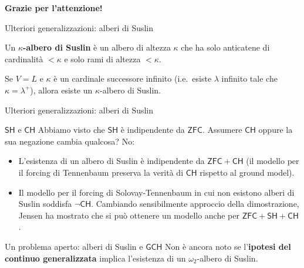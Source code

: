 \documentclass{beamer}
\theoremstyle{num.custom-title}
\theoremstyle{custom-title}
\newcommand{\ZFC}{\ensuremath{\mathsf{ZFC}}\xspace}
\newcommand{\GCH}{\ensuremath{\mathsf{GCH}}\xspace}
\newcommand{\CH}{\ensuremath{\mathsf{CH}}\xspace}
\newcommand{\SH}{\ensuremath{\mathsf{SH}}\xspace}
\renewcommand{\emph}[1]{\textbf{#1}}
\begin{document}
\begin{frame}[plain]
\begin{center}
\Large \textbf{Grazie per l'attenzione!}
\end{center}
\end{frame}


\begin{frame}{Ulteriori generalizzazioni: alberi di Suslin}

\begin{definition}
Un $\kappa$\emph{-albero di Suslin} è un albero di altezza $\kappa$ che ha solo anticatene di cardinalità $<\kappa$ e solo rami di altezza $<\kappa$.
\end{definition}

\begin{theorem}[Jensen, 1972]
Se $V=L$ e $\kappa$ è un cardinale successore infinito (i.e.\ esiste $\lambda$ infinito tale che $\kappa = \lambda^+$), allora esiste un $\kappa$-albero di Suslin.
\end{theorem}

\end{frame}


\begin{frame}{Ulteriori generalizzazioni: alberi di Suslin}

\begin{alertblock}{\SH e \CH}
Abbiamo visto che \SH è indipendente da \ZFC. Assumere \CH oppure la sua negazione cambia qualcosa? No:
\vspace{-5pt}
\begin{itemize}
\item L'esistenza di un albero di Suslin è indipendente da $\ZFC + \CH$ (il modello per il forcing di Tennenbaum preserva la verità di \CH rispetto al ground model).
\item Il modello per il forcing di Solovay-Tennenbaum in cui non esistono alberi di Suslin soddisfa $\neg \CH$. Cambiando sensibilmente approccio della dimostrazione, Jensen ha mostrato che si può ottenere un modello anche per $\ZFC + \SH + \CH$.
\end{itemize}
\end{alertblock}

\begin{exampleblock}{Un problema aperto: alberi di Suslin e \GCH}
Non è ancora noto se l'\emph{ipotesi del continuo generalizzata} implica l'esistenza di un $\omega_2$-albero di Suslin.
\end{exampleblock}

\end{frame}
\end{document}
